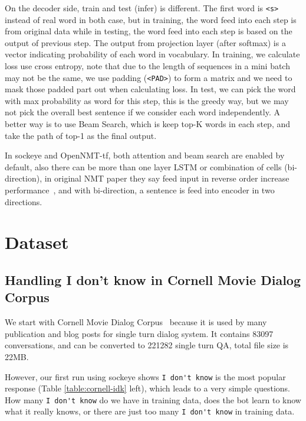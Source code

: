 \documentclass{article}
\begin{document}

On the decoder side, train and test (infer) is different.
The first word is \verb+<s>+ instead of real word in both case, but in training, the word feed into each step is from
original data while in testing, the word feed into each step is based on the output of previous step.
The output from projection layer (after softmax) is a vector indicating probability of each word in vocabulary.
In training, we calculate loss use cross entropy, note that due to the length of sequences in a mini batch may not be the same,
we use padding (\verb+<PAD>+) to form a matrix and we need to mask those padded part out when calculating loss.
In test, we can pick the word with max probability as word for this step, this is the greedy way,
but we may not pick the overall best sentence if we consider each word independently.
A better way is to use Beam Search, which is keep top-K words in each step, and take the path of top-1 as the final output.

In sockeye and OpenNMT-tf, both attention and beam search are enabled by default, also there can be more than one layer LSTM
or combination of cells (bi-direction), in original NMT paper they say feed input in reverse order increase performance~\cite{sutskever2014sequence},
and with bi-direction, a sentence is feed into encoder in two directions.

\section{Dataset}
\label{sec:dataset}

\subsection{Handling I don't know in Cornell Movie Dialog Corpus}
\label{subsec:idk}

We start with Cornell Movie Dialog Corpus~\cite{data:cornell} because it is used by many publication and blog posts for single turn dialog system.
It contains 83097 conversations, and can be converted to 221282 single turn QA, total file size is 22MB.

However, our first run using sockeye shows \verb+I don't know+ is the most popular response (Table \ref{table:cornell-idk} left),
which leads to a very simple questions. How many \verb+I don't know+ do we have in training data,
does the bot learn to know what it really knows, or there are just too many \verb+I don't know+ in training data.
\end{document}

